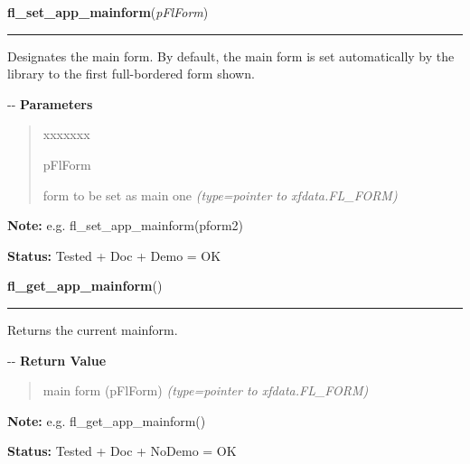 \hspace{.8\funcindent}\begin{boxedminipage}{\funcwidth}

    \raggedright \textbf{fl\_set\_app\_mainform}(\textit{pFlForm})

    \vspace{-1.5ex}

    \rule{\textwidth}{0.5\fboxrule}
\setlength{\parskip}{2ex}

Designates the main form. By default, the main form is set
automatically by the library to the first full-bordered form shown.

-{}-
\setlength{\parskip}{1ex}
      \textbf{Parameters}
      \vspace{-1ex}

      \begin{quote}
        \begin{Ventry}{xxxxxxx}

          \item[pFlForm]


form to be set as main one
            {\it (type=pointer to xfdata.FL\_FORM)}

        \end{Ventry}

      \end{quote}

\textbf{Note:} 
e.g. fl\_set\_app\_mainform(pform2)


\textbf{Status:} 
Tested + Doc + Demo = OK


    \end{boxedminipage}

    \label{xformslib:flbasic:fl_get_app_mainform}

    \vspace{0.5ex}

\hspace{.8\funcindent}\begin{boxedminipage}{\funcwidth}

    \raggedright \textbf{fl\_get\_app\_mainform}()

    \vspace{-1.5ex}

    \rule{\textwidth}{0.5\fboxrule}
\setlength{\parskip}{2ex}

Returns the current mainform.

-{}-
\setlength{\parskip}{1ex}
      \textbf{Return Value}
    \vspace{-1ex}

      \begin{quote}

main form (pFlForm)
      {\it (type=pointer to xfdata.FL\_FORM)}

      \end{quote}

\textbf{Note:} 
e.g. fl\_get\_app\_mainform()


\textbf{Status:} 
Tested + Doc + NoDemo = OK


    \end{boxedminipage}

